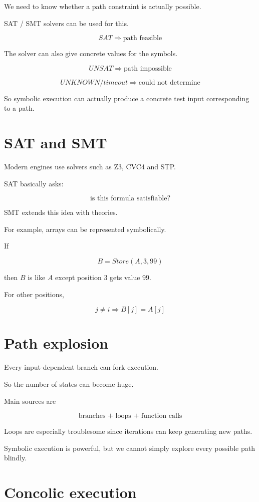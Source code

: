 \documentclass[11pt]{book}
\begin{document}
We need to know whether a path constraint is actually
possible.

SAT / SMT solvers can be used for this.

\[
SAT \Rightarrow \text{path feasible}
\]

The solver can also give concrete values for the symbols.

\[
UNSAT \Rightarrow \text{path impossible}
\]

\[
UNKNOWN/timeout
\Rightarrow
\text{could not determine}
\]

So symbolic execution can actually produce a concrete
test input corresponding to a path.

\section{SAT and SMT}

Modern engines use solvers such as Z3, CVC4 and STP.

SAT basically asks:

\[
\text{is this formula satisfiable?}
\]

SMT extends this idea with theories.

For example, arrays can be represented symbolically.

If

\[
B = Store(A,3,99)
\]

then $B$ is like $A$ except position $3$ gets value $99$.

For other positions,

\[
j\neq i \Rightarrow B[j]=A[j]
\]

\section{Path explosion}

Every input-dependent branch can fork execution.

So the number of states can become huge.

Main sources are

\[
\text{branches + loops + function calls}
\]

Loops are especially troublesome since iterations
can keep generating new paths.

\begin{pppitfall}
Symbolic execution is powerful, but we cannot simply
explore every possible path blindly.
\end{pppitfall}

\section{Concolic execution}
\end{document}
